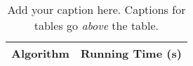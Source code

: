 %
%
\begin{table}[t]
    \centering
    \caption{
        \label{tab:plain-table}
        Add your caption here. Captions for tables go {\em above}
        the table.
    }
    \begin{tabular}{lr}
        \toprule
            {\bf Algorithm}  &
            {\bf Running Time (s)}
            \\

        \midrule

        

        \bottomrule
    \end{tabular}
\end{table}